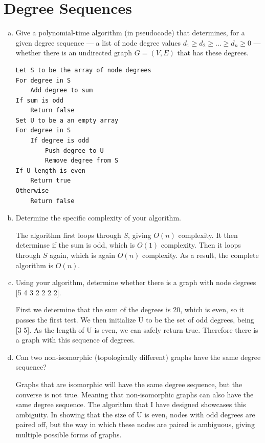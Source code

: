 \documentclass[12pt]{article}
\begin{document}
\section{Degree Sequences}\label{degree sequences}
\begin{enumerate}[(a)]
\item Give a polynomial-time algorithm (in pseudocode) that determines, for a given degree sequence — a
list of node degree values $d_1 \geq d_2 \geq ... \geq d_n \geq 0$ — whether there is an undirected graph $G = (V,E)$ that has these degrees.
\begin{addmargin}[2em]{2em}
\begin{lstlisting}
Let S to be the array of node degrees
For degree in S
    Add degree to sum
If sum is odd
    Return false
Set U to be a an empty array
For degree in S
    If degree is odd
        Push degree to U
        Remove degree from S
If U length is even
    Return true
Otherwise
    Return false
\end{lstlisting}
\end{addmargin}
\item Determine the specific complexity of your algorithm.
\begin{addmargin}[2em]{2em}
The algorithm first loops through $S$, giving $O(n)$ complexity. It then determinse if the sum is odd, which is $O(1)$ complexity. Then it loops through $S$ again, which is again $O(n)$ complexity. As a result, the complete algorithm is $O(n)$.
\end{addmargin}
\item Using your algorithm, determine whether there is a graph with node degrees [5 4 3 2 2 2 2].
\begin{addmargin}[2em]{2em}
First we determine that the sum of the degrees is 20, which is even, so it passes the first test. We then initialize U to be the set of odd degrees, being [3 5]. As the length of U is even, we can safely return true. Therefore there is a graph with this sequence of degrees.
\end{addmargin}
\item Can two non-isomorphic (topologically different) graphs have the same degree sequence?
\begin{addmargin}[2em]{2em}
Graphs that are isomorphic will have the same degree sequence, but the converse is not true. Meaning that non-isomorphic graphs can also have the same degree sequence. The algorithm that I have designed showcases this ambiguity. In showing that the size of U is even, nodes with odd degrees are paired off, but the way in which these nodes are paired is ambiguous, giving multiple possible forms of graphs.
\end{addmargin}
\end{enumerate}
\end{document}
